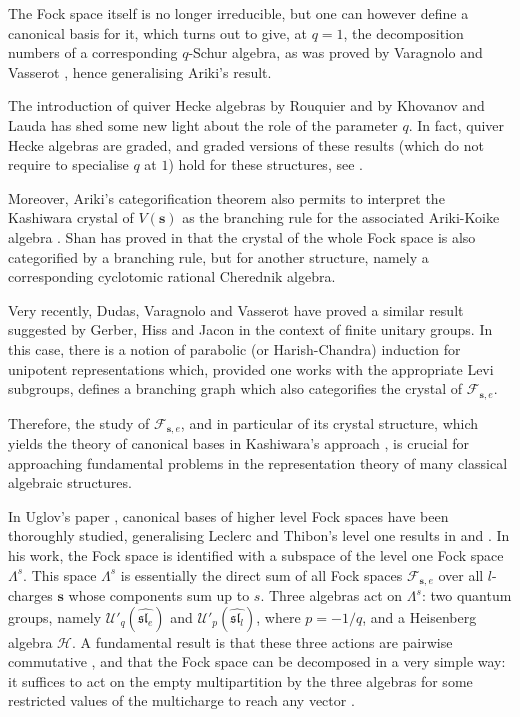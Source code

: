 \documentclass[twoside,12pt]{amsart}
\theoremstyle{plain}
\newcommand{\cF}{\mathcal{F}}
\newcommand{\cH}{\mathcal{H}}
\newcommand{\bs}{\mathbf{s}}
\newcommand{\La}{\Lambda}
\newcommand{\Ue}{\mathcal{U}'_q (\widehat{\mathfrak{sl}_e})}
\newcommand{\Ul}{\mathcal{U}'_p (\widehat{\mathfrak{sl}_l})}
\theoremstyle{remark}
\begin{document}
The Fock space itself is no longer irreducible, but one can however define a canonical basis for it,
which turns out to give, at $q=1$, the decomposition numbers of a corresponding $q$-Schur algebra, as
was proved by Varagnolo and Vasserot \cite{VaragnoloVasserot1999}, hence generalising Ariki's result.

The introduction of quiver Hecke algebras by Rouquier \cite{Rouquier2008a}
and by Khovanov and Lauda \cite{KhovanovLauda2008} has shed some new light about the role of the parameter $q$.
In fact, quiver Hecke algebras are graded, and graded versions of these 
results (which do not require to specialise $q$ at $1$) hold for these structures, 
see \cite{BrundanKleshchev2009}.

Moreover, Ariki's categorification theorem also permits to interpret the Kashiwara crystal
of $V(\bs)$ as the branching rule for the associated Ariki-Koike algebra \cite{Ariki2007}.
Shan has proved in \cite{Shan2011} that the crystal of the whole Fock space
is also categorified by a branching rule, but for another structure, namely a
corresponding cyclotomic rational Cherednik algebra.

Very recently, Dudas, Varagnolo and Vasserot \cite{DudasVaragnoloVasserot2015} have proved
a similar result suggested by Gerber, Hiss and Jacon \cite{GerberHissJacon2015}
in the context of finite unitary groups.
In this case, there is a notion of parabolic (or Harish-Chandra) induction for unipotent representations
which, provided one works with the appropriate Levi subgroups,
defines a branching graph which also categorifies the crystal of $\cF_{\bs,e}$.

\medskip

Therefore, the study of $\cF_{\bs,e}$, and in particular of
its crystal structure, which yields the theory of canonical bases in Kashiwara's approach \cite{Kashiwara1993},
is crucial for approaching fundamental problems in the representation theory of many
classical algebraic structures.

In Uglov's paper \cite{Uglov1999}, canonical bases of higher level Fock spaces have been
thoroughly studied, generalising Leclerc and Thibon's level one results in \cite{LeclercThibon1996} and
\cite{LeclercThibon2001}.
In his work, the Fock space is identified with a subspace of the level one Fock space $\La^s$.
This space $\La^s$ is essentially the direct sum of all Fock spaces $\cF_{\bs,e}$
over all $l$-charges $\bs$ whose components sum up to $s$.
Three algebras act on $\La^s$:
two quantum groups, namely $\Ue$ and $\Ul$, where $p=-1/q$, and a Heisenberg algebra $\cH$.
A fundamental result is that these three actions are pairwise commutative \cite[Proposition 4.6]{Uglov1999}, 
and that the Fock space can be decomposed in a very simple way:
it suffices to act on the empty multipartition by the three algebras for some
restricted values of the multicharge to reach any vector \cite[Theorem 4.8]{Uglov1999}.
\end{document}

